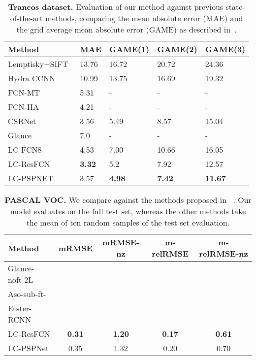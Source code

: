 \documentclass[runningheads]{llncs}
\begin{document}
\begin{table}[t]
\centering
\caption{{\bf Trancos dataset.} Evaluation of our method against previous state-of-the-art methods, comparing the mean absolute error (MAE) and the grid average mean absolute error (GAME) as described in~\cite{TRANCOSdataset_IbPRIA2015}.}
\def\tabularxcolumn#1{m{#1}}
\begin{tabularx}{\textwidth}{l *{3}{Y|}*{1}{Y} }
  {\bf Method} & {\bf MAE} & {\bf GAME(1)} & {\bf GAME(2)} & {\bf GAME(3)} \\\hline\hline
Lemptisky+SIFT~\cite{TRANCOSdataset_IbPRIA2015} & 13.76&16.72&20.72&24.36 \\\hline
  Hydra CCNN~\cite{onoro2016towards}  & 10.99 &13.75&16.69&19.32\\\hline
   FCN-MT~\cite{zhang2017understanding}  & 5.31 &-&-&-\\\hline
 FCN-HA~\cite{zhang2017fcn}  & 4.21 &-&-&-\\\hline
  CSRNet~\cite{Yuhong2018}  & 3.56 &5.49&8.57&15.04\\\hline\hline
  Glance & 7.0  & -  & - &  -\\\hline
  LC-FCN8  &  4.53  &7.00 & 10.66 & 16.05 \\\hline
LC-ResFCN & {\bf 3.32}  &5.2 &7.92 &12.57 \\\hline
    LC-PSPNET &  3.57  &{\bf 4.98} &{\bf 7.42} &{\bf 11.67} \\\hline
\end{tabularx}
\label{table:trancos}
\end{table}


\begin{table}
\centering
\caption{{\bf PASCAL VOC.} We compare against the methods proposed in ~\cite{chattopadhyay2016counting}. Our model evaluates on the full test set, whereas the other methods take the mean of ten random samples of the test set evaluation.}

\begin{tabular}{l|c|c|c|c}
  \bf Method & \bf mRMSE & \bf mRMSE-nz & \bf m-relRMSE & \bf {\small m-relRMSE-nz}\\ \hline\hline
  Glance-noft-2L~\cite{chattopadhyay2016counting}& &  &  & \\ \hline
   Aso-sub-ft-~\cite{chattopadhyay2016counting} &  &  &  & \\ \hline Faster-RCNN~\cite{chattopadhyay2016counting}&  &  & &\\
 \hline
 \hline
LC-ResFCN& {\bf 0.31} & {\bf 1.20}&{\bf 0.17}&   {\bf 0.61}\\ \hline
LC-PSPNet& 0.35 & 1.32 & 0.20&  0.70\\ \hline
\end{tabular}
\label{tab:pascal}
\end{table}
\end{document}
